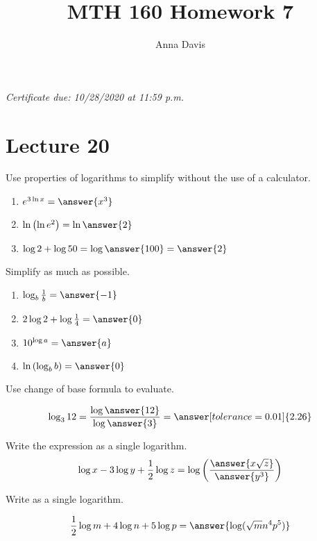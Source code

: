\documentclass{ximera}
\author{Anna Davis} \title{MTH 160 Homework 7}
\begin{document}
\begin{abstract}

\end{abstract}
\maketitle
 \textit{Certificate due: 10/28/2020 at 11:59 p.m.}
 \section{Lecture 20}
 
  \begin{problem}\label{prob:160hom8prob1} 
Use properties of logarithms to simplify without the use of a calculator.
\begin{enumerate}
    \item $e^{3\ln x}=\answer{x^3}$
    \item $\ln\left(\ln e^2\right)=\ln\answer{2}$
    \item $\log 2 +\log 50=\log \answer{100}=\answer{2}$
\end{enumerate}
\end{problem}

\begin{problem}\label{prob:160hom8prob8}
 Simplify as much as possible.
 \begin{enumerate}
     \item $\log_b \frac{1}{b}=\answer{-1}$
     \item $2\log 2+\log\frac{1}{4}=\answer{0}$
     \item $10^{\log a}=\answer{a}$
     \item $\ln\left(\log_b b\right)=\answer{0}$
 \end{enumerate}
 \end{problem}

\begin{problem}\label{prob:160hom8prob2}
Use change of base formula to evaluate. 

$$\log_3 12=\frac{\log\answer{12}}{\log\answer{3}}=\answer[tolerance=0.01]{2.26}$$
\end{problem}

\begin{problem}\label{prob:160hom8prob3}
Write the expression as a single logarithm.
$$\log x-3\log y+\frac{1}{2}\log z=\log\left(\frac{\answer{x\sqrt{z}}}{\answer{y^3}}\right)$$
\end{problem}

\begin{problem}\label{prob:160hom8prob10}
 Write as a single logarithm.
 
 $$\frac{1}{2}\log m+4\log n+5\log p=\answer{\log(\sqrt{m}n^4p^5)}$$
 \end{problem}
 
\end{document}

